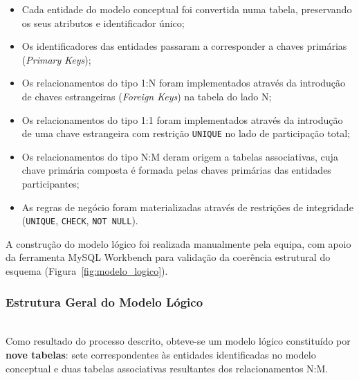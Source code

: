 \documentclass[runningheads]{llncs}
\begin{document}
                \begin{itemize}
                    \item Cada entidade do modelo conceptual foi convertida numa tabela, preservando
                    os seus atributos e identificador único;
                    \item Os identificadores das entidades passaram a corresponder a chaves primárias
                    (\textit{Primary Keys});
                    \item Os relacionamentos do tipo 1:N foram implementados através da introdução de
                    chaves estrangeiras (\textit{Foreign Keys}) na tabela do lado N;
                    \item Os relacionamentos do tipo 1:1 foram implementados através da introdução de
                    uma chave estrangeira com restrição \texttt{UNIQUE} no lado de participação total;
                    \item Os relacionamentos do tipo N:M deram origem a tabelas associativas, cuja
                    chave primária composta é formada pelas chaves primárias das entidades participantes;
                    \item As regras de negócio foram materializadas através de restrições de
                    integridade (\texttt{UNIQUE}, \texttt{CHECK}, \texttt{NOT NULL}).
                \end{itemize}

                \noindent A construção do modelo lógico foi realizada manualmente pela equipa, com
                apoio da ferramenta MySQL Workbench para validação da coerência estrutural do
                esquema (Figura~\ref{fig:modelo_logico}).

                \subsubsection{Estrutura Geral do Modelo Lógico}\mbox{}\\

                Como resultado do processo descrito, obteve-se um modelo lógico constituído por
                \textbf{nove tabelas}: sete correspondentes às entidades identificadas no modelo
                conceptual e duas tabelas associativas resultantes dos relacionamentos N:M.
\end{document}
